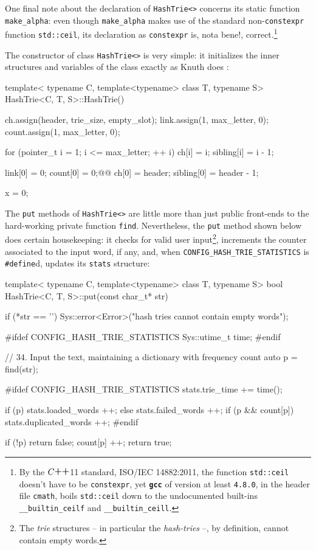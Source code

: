 \documentclass[a4paper,11pt]{article}
\renewcommand{\=}{\protect\nobreakdash-\hspace{0pt}}
\renewcommand{\~}{\protect\nobreakdash--\hspace{0pt}}
\newcommand{\plusplus}{\textbf{\raisebox{1pt}{++}}}
\newcommand{\cplusplus}{$C\plusplus$}
\newcommand{\code}[1]{{\tt{#1}}}
\newcommand\code*[1]{\mbox{\code{#1}}}
\newcommand{\prog}[1]{{\tt\textbf{#1}}}
\newcommand{\pg}[1]{p.~#1}
\newcommand{\para}[1]{\mbox{\S\hspace{1pt}#1}}
\newcommand{\parapg}[2]{\para{#1}, \pg{#2}}
\newcommand{\define}{\code{{\#}define}}%
\begin{document}
One final note about the declaration of \code{HashTrie<>} concerns its static
function \code{make\_alpha}: even though \code{make\_alpha} makes use of
the standard non-\code{constexpr} function \code{std::ceil}, its declaration as
\code{constexpr} is, nota bene!, correct.\footnote{%
By the \cplusplus11 standard, ISO/IEC 14882:2011,
the function \code{std::ceil} doesn't have to be \code{constexpr}, yet
\prog{gcc} of version at least \code{4.8.0}, in the header file \code{cmath},
boils \code{std::ceil} down to the undocumented built-ins
\code{\_\_builtin\_ceilf} and 
\code{\_\_builtin\_ceill}.}

The constructor of class \code{HashTrie<>} is very simple: it initializes the
inner structures and variables of the class exactly as Knuth does 
\cite[\parapg{19}{159} and \parapg{23}{160}]{knuth:literate}:
%
%
\begin{hashtrielisting}[2298]
template<
	typename C,
	template<typename> class T,
	typename S>
HashTrie<C, T, S>::HashTrie()
{
	ch.assign(header, trie_size, empty_slot);
	link.assign(1, max_letter, 0);
	count.assign(1, max_letter, 0);

	for (pointer_t i = 1; i <= max_letter; ++ i) {
		ch[i] = i;
		sibling[i] = i - 1;
	}

	link[0] = 0;
	count[0] = 0;@\label{cpp-init-count-zero}@
	ch[0] = header;
	sibling[0] = header - 1;

	x = 0;
}
\end{hashtrielisting}
%
The \code{put} methods of \code{HashTrie<>} are little more than just public
front-ends to the hard-working private function \code{find}. Nevertheless,
the \code{put} method shown below does certain housekeeping:
it checks for valid user input\footnote{The \emph{trie} structures
\cite[\para{6.3}]{knuth:taocp3}
-- in particular the \emph{hash-tries} --, by definition, cannot
contain empty words.}, increments the counter associated to the input word,
if any, and, when \code{CONFIG\_HASH\_TRIE\_STATISTICS}
is \define d, updates its \code{stats} structure:
%
%
\begin{hashtrielisting}[2644]
template<
	typename C,
	template<typename> class T,
	typename S>
bool HashTrie<C, T, S>::put(const char_t* str)
{
	if (*str == '\0')
		Sys::error<Error>("hash tries cannot contain empty words");

#ifdef CONFIG_HASH_TRIE_STATISTICS
	Sys::utime_t time;
#endif

	// 34. Input the text, maintaining a dictionary with frequency count
	auto p = find(str);

#ifdef CONFIG_HASH_TRIE_STATISTICS
	stats.trie_time += time();

	if (p)
		stats.loaded_words ++;
	else
		stats.failed_words ++;
	if (p && count[p])
		stats.duplicated_words ++;
#endif

	if (!p) return false;
	count[p] ++;
	return true;
}
\end{hashtrielisting}
\end{document}
